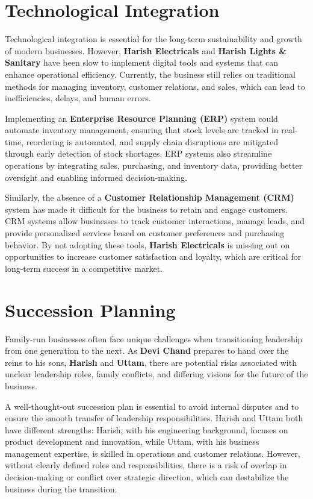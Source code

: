 \documentclass[a4paper,12pt]{report}
\begin{document}
\section{Technological Integration}
Technological integration is essential for the long-term sustainability and growth of modern businesses. However, \textbf{Harish Electricals} and \textbf{Harish Lights \& Sanitary} have been slow to implement digital tools and systems that can enhance operational efficiency. Currently, the business still relies on traditional methods for managing inventory, customer relations, and sales, which can lead to inefficiencies, delays, and human errors.

Implementing an \textbf{Enterprise Resource Planning (ERP)} system could automate inventory management, ensuring that stock levels are tracked in real-time, reordering is automated, and supply chain disruptions are mitigated through early detection of stock shortages. ERP systems also streamline operations by integrating sales, purchasing, and inventory data, providing better oversight and enabling informed decision-making.

Similarly, the absence of a \textbf{Customer Relationship Management (CRM)} system has made it difficult for the business to retain and engage customers. CRM systems allow businesses to track customer interactions, manage leads, and provide personalized services based on customer preferences and purchasing behavior. By not adopting these tools, \textbf{Harish Electricals} is missing out on opportunities to increase customer satisfaction and loyalty, which are critical for long-term success in a competitive market.

\section{Succession Planning}
Family-run businesses often face unique challenges when transitioning leadership from one generation to the next. As \textbf{Devi Chand} prepares to hand over the reins to his sons, \textbf{Harish} and \textbf{Uttam}, there are potential risks associated with unclear leadership roles, family conflicts, and differing visions for the future of the business.

A well-thought-out succession plan is essential to avoid internal disputes and to ensure the smooth transfer of leadership responsibilities. Harish and Uttam both have different strengths: Harish, with his engineering background, focuses on product development and innovation, while Uttam, with his business management expertise, is skilled in operations and customer relations. However, without clearly defined roles and responsibilities, there is a risk of overlap in decision-making or conflict over strategic direction, which can destabilize the business during the transition.
\end{document}
